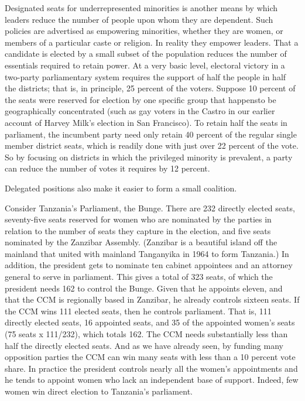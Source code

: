 \documentclass[10pt]{article}
\begin{document}
{\large Designated seats for underrepresented minorities is another means by
which leaders reduce the number of people upon whom they are dependent. Such
policies are advertised as empowering minorities, whether they are women, or
members of a particular caste or religion. In reality they empower leaders. That
a candidate is elected by a small subset of the population reduces the number of
essentials required to retain power. At a very basic level, electoral victory in
a two-party parliamentary system requires the support of half the people in half
the districts; that is, in principle, 25 percent of the voters. Suppose 10
percent of the seats were reserved for election by one specific group that
happensto be geographically concentrated (such as gay voters in the Castro in our
earlier account of Harvey Milk's election in San Francisco). To retain half the
seats in parliament, the incumbent party need only retain 40 percent of the
regular single member district seats, which is readily done with just over 22
percent of the vote. So by focusing on districts in which the privileged minority
is prevalent, a party can reduce the number of votes it requires by 12 percent.}

{\large Delegated positions also make it easier to form a small coalition.}

{\large Consider Tanzania's Parliament, the Bunge. There are 232 directly
elected seats, seventy-five seats reserved for women who are nominated by the
parties in relation to the number of seats they capture in the election, and five
seats nominated by the Zanzibar Assembly. (Zanzibar is a beautiful island off the
mainland that united with mainland Tanganyika in 1964 to form Tanzania.) In
addition, the president gets to nominate ten cabinet appointees and an attorney
general to serve in parliament. This gives a total of 323 seats, of which the
president needs 162 to control the Bunge. Given that he appoints eleven, and that
the CCM is regionally based in Zanzibar, he already controls sixteen seats. If
the CCM wins 111 elected seats, then he controls parliament. That is, 111
directly elected seats, 16 appointed seats, and 35 of the appointed women's seats
(75 seats x 111/232), which totals 162. The CCM needs substantially less than
half the directly elected seats. And as we have already seen, by funding many
opposition parties the CCM can win many seats with less than a 10 percent vote
share. In practice the president controls nearly all the women's appointments and
he tends to appoint women who lack an independent base of support. Indeed, few
women win direct election to Tanzania's parliament.}
\end{document}
